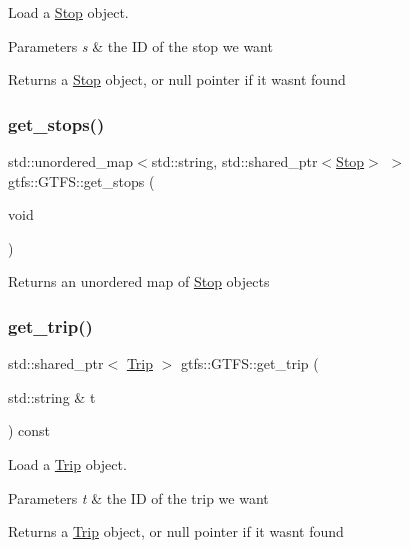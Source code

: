 Load a \hyperlink{classgtfs_1_1Stop}{Stop} object. 
\begin{DoxyParams}{Parameters}
{\em s} & the ID of the stop we want \\
\hline
\end{DoxyParams}
\begin{DoxyReturn}{Returns}
a \hyperlink{classgtfs_1_1Stop}{Stop} object, or null pointer if it wasn\textquotesingle{}t found 
\end{DoxyReturn}
\mbox{\label{classgtfs_1_1GTFS_a33a81248120e12d5a5d52a92821b827e}} 
\subsubsection{\texorpdfstring{get\+\_\+stops()}{get\_stops()}}
{\footnotesize\ttfamily std\+::unordered\+\_\+map$<$std\+::string, std\+::shared\+\_\+ptr$<$\hyperlink{classgtfs_1_1Stop}{Stop}$>$ $>$ gtfs\+::\+G\+T\+F\+S\+::get\+\_\+stops (\begin{DoxyParamCaption}\item[{void}]{ }\end{DoxyParamCaption})\hspace{0.3cm}{\ttfamily [inline]}}

\begin{DoxyReturn}{Returns}
an unordered map of \hyperlink{classgtfs_1_1Stop}{Stop} objects 
\end{DoxyReturn}
\mbox{\label{classgtfs_1_1GTFS_aec86fae3dee1e13f541798266fb2317e}} 
\subsubsection{\texorpdfstring{get\+\_\+trip()}{get\_trip()}}
{\footnotesize\ttfamily std\+::shared\+\_\+ptr$<$ \hyperlink{classgtfs_1_1Trip}{Trip} $>$ gtfs\+::\+G\+T\+F\+S\+::get\+\_\+trip (\begin{DoxyParamCaption}\item[{std\+::string \&}]{t }\end{DoxyParamCaption}) const}

Load a \hyperlink{classgtfs_1_1Trip}{Trip} object. 
\begin{DoxyParams}{Parameters}
{\em t} & the ID of the trip we want \\
\hline
\end{DoxyParams}
\begin{DoxyReturn}{Returns}
a \hyperlink{classgtfs_1_1Trip}{Trip} object, or null pointer if it wasn\textquotesingle{}t found 
\end{DoxyReturn}
\mbox{\label{classgtfs_1_1GTFS_ad526fc627fe1ce81b8a669f6187be0c0}} 
